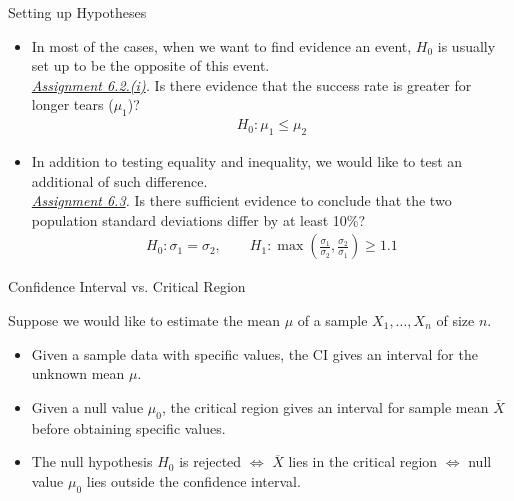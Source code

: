 \begin{frame}{Setting up Hypotheses}


\begin{itemize}
	\justifying
	\item {} In most of the cases, when we want to find evidence  an event, $H_0$ is usually set up to be the opposite of this event. \\
	\emph{\underline{Assignment 6.2.(i)}.} Is there evidence that the success rate is greater for longer tears ($\mu_1$)?
	\begin{align*}
	H_0: \mu_1\leq \mu_2
	\end{align*}
	\item {} In addition to testing equality and inequality, we would like to test an additional  of such difference.\\
	\emph{\underline{Assignment 6.3}.} Is there sufficient evidence to conclude that the two population standard deviations differ by at least 10\%?
	\begin{align*}
	H_0: \sigma_1 = \sigma_2, \qquad H_1: \max\left(\frac{\sigma_1}{\sigma_2}, \frac{\sigma_2}{\sigma_1} \right) \geq 1.1
	\end{align*}
\end{itemize}


\end{frame}


\begin{frame}{Confidence Interval vs. Critical Region}

\justifying
Suppose we would like to estimate the mean $\mu$ of a sample $X_1, \ldots, X_n$ of size $n$.
\begin{itemize}
	\justifying
	\item {} Given a sample data with specific values, the CI gives an interval for the unknown mean $\mu$.
	\item {} Given a null value $\mu_0$, the critical region gives an interval for sample mean $\overline{X}$ before obtaining specific values.
	\item {} The null hypothesis $H_0$ is rejected $\Leftrightarrow$ $\overline{X}$ lies in the critical region $\Leftrightarrow$ null value $\mu_0$ lies outside the confidence interval.
\end{itemize}


\end{frame}


